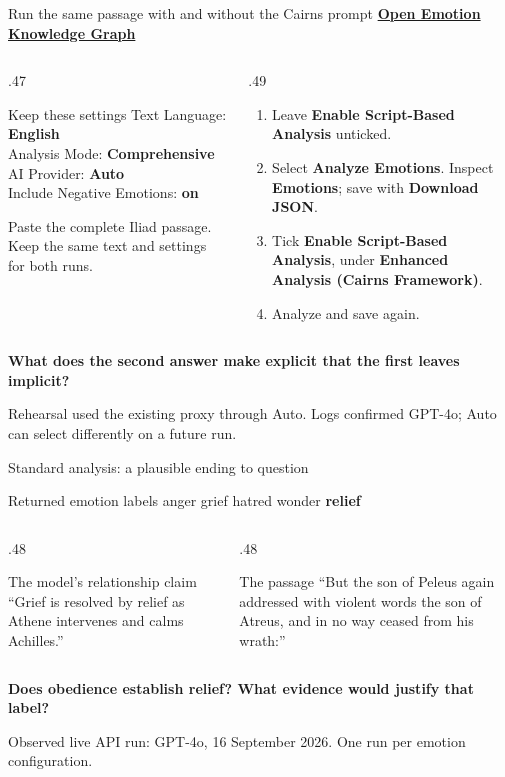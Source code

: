 \documentclass[aspectratio=169,10pt]{beamer}
\newcommand{\key}[1]{\textcolor{aegean}{\textbf{#1}}}
\newcommand{\hl}[1]{\textcolor{terracotta}{\textbf{#1}}}
\newcommand{\source}[1]{\vfill{\scriptsize\color{slate}#1\par}}
\newcommand{\observed}{\source{Observed live API run: GPT-4o, 16 September 2026. One run per emotion configuration.}}
\newcommand{\question}[1]{\medskip\par\key{#1}\par}
\newcommand{\emotionlink}{\href{https://greek-app-heaven-medea.livelyhill-85880e66.westeurope.azurecontainerapps.io/emotions}{\textbf{Open Emotion Knowledge Graph}}}
\begin{document}
\begin{frame}{Run the same passage with and without the Cairns prompt}
  \emotionlink
  \begin{columns}[T]
    \begin{column}{.47\textwidth}
      \begin{block}{Keep these settings}
        \small
        Text Language: \key{English}\\
        Analysis Mode: \key{Comprehensive}\\
        AI Provider: \key{Auto}\\
        Include Negative Emotions: \key{on}
      \end{block}
      \small Paste the complete Iliad passage. Keep the same text and settings for both runs.
    \end{column}
    \begin{column}{.49\textwidth}
      \begin{enumerate}
        \item Leave \textbf{Enable Script-Based Analysis} unticked.
        \item Select \textbf{Analyze Emotions}. Inspect \textbf{Emotions}; save with \textbf{Download JSON}.
        \item Tick \textbf{Enable Script-Based Analysis}, under \textbf{Enhanced Analysis (Cairns Framework)}.
        \item Analyze and save again.
      \end{enumerate}
    \end{column}
  \end{columns}
  \question{What does the second answer make explicit that the first leaves implicit?}
  \source{Rehearsal used the existing proxy through Auto. Logs confirmed GPT-4o; Auto can select differently on a future run.}
\end{frame}

\begin{frame}{Standard analysis: a plausible ending to question}
  \begin{block}{Returned emotion labels}
    anger \quad grief \quad hatred \quad wonder \quad \hl{relief}
  \end{block}
  \begin{columns}[T]
    \begin{column}{.48\textwidth}
      \begin{block}{The model's relationship claim}
        “Grief is resolved by relief as Athene intervenes and calms Achilles.”
      \end{block}
    \end{column}
    \begin{column}{.48\textwidth}
      \begin{block}{The passage}
        “But the son of Peleus again addressed with violent words the son of Atreus, and in no way ceased from his wrath:”
      \end{block}
    \end{column}
  \end{columns}
  \question{Does obedience establish relief? What evidence would justify that label?}
  \observed
\end{frame}
\end{document}

